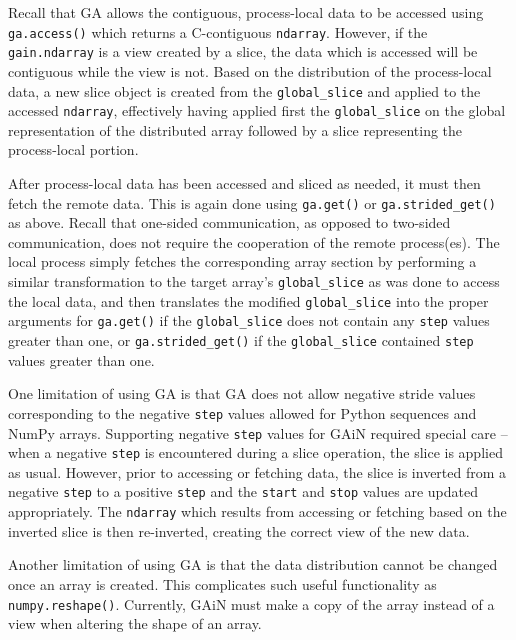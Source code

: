 \documentclass{sigplanconf}
\begin{document}
Recall that GA allows the contiguous, process-local data to be accessed using
\verb=ga.access()= which returns a C-contiguous \verb=ndarray=. However, if
the \verb=gain.ndarray= is a view created by a slice, the data which is
accessed will be contiguous while the view is not. Based on the distribution
of the process-local data, a new slice object is created from the
\verb=global_slice= and applied to the accessed \verb=ndarray=, effectively
having applied first the \verb=global_slice= on the global representation of
the distributed array followed by a slice representing the process-local
portion.

After process-local data has been accessed and sliced as needed, it must then
fetch the remote data. This is again done using \verb=ga.get()= or
\verb=ga.strided_get()= as above.  Recall that one-sided communication, as
opposed to two-sided communication, does not require the cooperation of the
remote process(es). The local process simply fetches the corresponding array
section by performing a similar transformation to the target array's
\verb=global_slice= as was done to access the local data, and then translates
the modified \verb=global_slice= into the proper arguments for \verb=ga.get()=
if the \verb=global_slice= does not contain any \verb=step= values greater
than one, or \verb=ga.strided_get()= if the \verb=global_slice= contained
\verb=step= values greater than one.

One limitation of using GA is that GA does not allow negative stride values
corresponding to the negative \verb=step= values allowed for Python sequences
and NumPy arrays. Supporting negative \verb=step= values for GAiN required
special care -- when a negative \verb=step= is encountered during a slice
operation, the slice is applied as usual. However, prior to accessing or
fetching data, the slice is inverted from a negative \verb=step= to a positive
\verb=step= and the \verb=start= and \verb=stop= values are updated
appropriately. The \verb=ndarray= which results from accessing or fetching
based on the inverted slice is then re-inverted, creating the correct view of
the new data.

Another limitation of using GA is that the data distribution cannot be changed
once an array is created. This complicates such useful functionality as
\verb=numpy.reshape()=. Currently, GAiN must make a copy of the array instead
of a view when altering the shape of an array.
\end{document}
